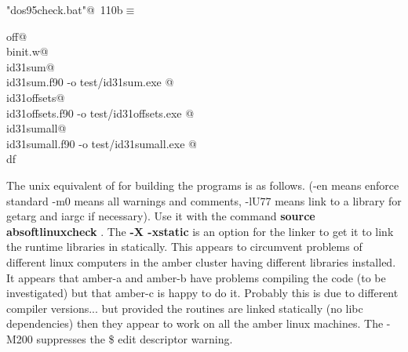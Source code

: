 \documentclass[10pt,a4paper,notitlepage]{article}
\newcommand{\code}[1]{\textbf{\textsf{#1}}} %
\begin{document}
\begin{flushleft} \small
\begin{minipage}{\linewidth}\label{scrap134}\raggedright\small
{} \verb@"dos95check.bat"@\nobreak\ {\footnotesize {110b}}$\equiv$
\vspace{-1ex}
\begin{list}{}{} \item
\mbox{}\verb@echo off@\\
\mbox{}\verb@nuweb binit.w@\\
\mbox{}\verb@echo id31sum@\\
\mbox{} id31sum.f90 -o test/id31sum.exe @\\
\mbox{}\verb@echo id31offsets@\\
\mbox{} id31offsets.f90 -o test/id31offsets.exe @\\
\mbox{}\verb@echo id31sumall@\\
\mbox{} id31sumall.f90 -o test/id31sumall.exe @\\
\mbox{}\verb@rem df %OPTS% /exe:sifit.exe       sifit.f90        @{\NWsep}
\end{list}
\vspace{-1.5ex}
\footnotesize
\begin{list}{}{\setlength{\itemsep}{-\parsep}\setlength{\itemindent}{-\leftmargin}}

\item{}
\end{list}
\end{minipage}\vspace{4ex}
\end{flushleft}
The unix equivalent of for building the programs is as follows. 
(-en means enforce standard -m0 means all warnings and comments, 
-lU77 means link to a library for getarg and iargc if necessary). 
Use it with the command \code{source absoftlinuxcheck} .
The \code{-X -xstatic} is an option for the linker to get it to 
link the runtime libraries in statically. This appears to circumvent
problems of different linux computers in the amber cluster having
different libraries installed.
It appears that amber-a and amber-b have problems compiling the code (to
be investigated) but that amber-c is happy to do it. 
Probably this is due to different compiler versions... but provided the 
routines are linked statically (no libc dependencies) then they appear
to work on all the amber linux machines.
The -M200 suppresses the \$ edit descriptor warning.
\end{document}
